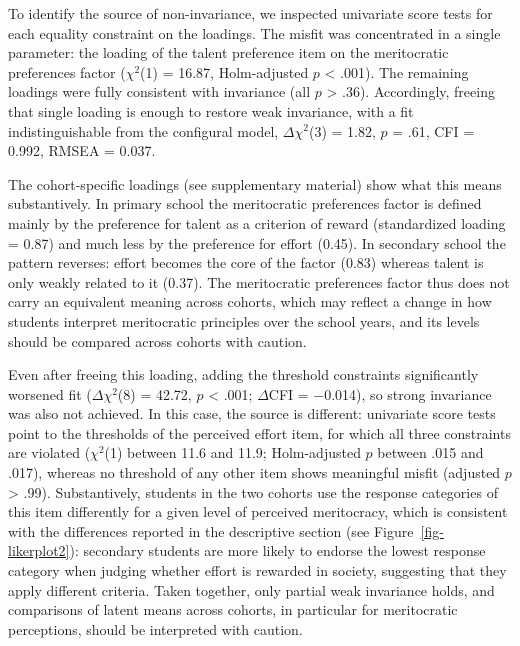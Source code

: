 \documentclass[
  11pt,
]{article}
\begin{document}
To identify the source of non-invariance, we inspected univariate score
tests for each equality constraint on the loadings. The misfit was
concentrated in a single parameter: the loading of the talent preference
item on the meritocratic preferences factor (\(\chi^2\)(1) = 16.87,
Holm-adjusted \(p\) \textless{} .001). The remaining loadings were fully
consistent with invariance (all \(p\) \textgreater{} .36). Accordingly,
freeing that single loading is enough to restore weak invariance, with a
fit indistinguishable from the configural model, \(\Delta \chi^2\)(3) =
1.82, \(p\) = .61, CFI = 0.992, RMSEA = 0.037.

The cohort-specific loadings (see supplementary material) show what this
means substantively. In primary school the meritocratic preferences
factor is defined mainly by the preference for talent as a criterion of
reward (standardized loading = 0.87) and much less by the preference for
effort (0.45). In secondary school the pattern reverses: effort becomes
the core of the factor (0.83) whereas talent is only weakly related to
it (0.37). The meritocratic preferences factor thus does not carry an
equivalent meaning across cohorts, which may reflect a change in how
students interpret meritocratic principles over the school years, and
its levels should be compared across cohorts with caution.

Even after freeing this loading, adding the threshold constraints
significantly worsened fit (\(\Delta \chi^2\)(8) = 42.72, \(p\)
\textless{} .001; \(\Delta\)CFI = −0.014), so strong invariance was also
not achieved. In this case, the source is different: univariate score
tests point to the thresholds of the perceived effort item, for which
all three constraints are violated (\(\chi^2\)(1) between 11.6 and 11.9;
Holm-adjusted \(p\) between .015 and .017), whereas no threshold of any
other item shows meaningful misfit (adjusted \(p\) \textgreater{} .99).
Substantively, students in the two cohorts use the response categories
of this item differently for a given level of perceived meritocracy,
which is consistent with the differences reported in the descriptive
section (see Figure~\ref{fig-likerplot2}): secondary students are more
likely to endorse the lowest response category when judging whether
effort is rewarded in society, suggesting that they apply different
criteria. Taken together, only partial weak invariance holds, and
comparisons of latent means across cohorts, in particular for
meritocratic perceptions, should be interpreted with caution.
\end{document}

